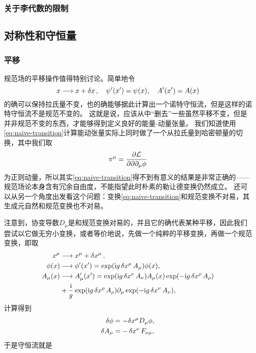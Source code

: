 \documentclass[hyperref, UTF8, a4paper]{ctexart}
\newcommand*{\ii}{\mathrm{i}}
\begin{document}
\subsubsection{关于李代数的限制}


\subsection{对称性和守恒量}

\subsubsection{平移}\label{sec:transition}

规范场的平移操作值得特别讨论。简单地令
\begin{equation}
    x \longrightarrow x + \var{x}, \quad \psi'(x') = \psi(x), \quad A'(x') = A(x)
    \label{eq:naive-transition}
\end{equation}
的确可以保持拉氏量不变，也的确能够据此计算出一个诺特守恒流，但是这样的诺特守恒流不是规范不变的。
这就是说，应该从中“删去”一些虽然平移不变，但是并非规范不变的东西，才能够得到定义良好的能量-动量张量。
我们知道使用\eqref{eq:naive-transition}计算能动张量实际上同时做了一个从拉氏量到哈密顿量的切换，其中我们取
\[
    \pi^\mu = \pdv{\mathcal{L}}{\partial \partial_\mu \phi}
\]
为正则动量，所以其实\eqref{eq:naive-transition}得不到有意义的结果是非常正确的——规范场论本身含有冗余自由度，不能指望此时朴素的勒让德变换仍然成立。
还可以从另一个角度出发看这个问题：变换\eqref{eq:naive-transition}和规范变换不对易，其生成元自然和规范变换也不对易。

注意到，协变导数$D_\mu$是和规范变换对易的，并且它的确代表某种平移，因此我们尝试以它做无穷小变换，或者等价地说，先做一个纯粹的平移变换，再做一个规范变换，即取
\begin{equation}
    \begin{aligned}
        x^\mu &\longrightarrow x^\mu + \var{x^\mu}, \\
        \phi(x) &\longrightarrow \phi'(x') = \exp(\ii g \var{x^\mu} A_\mu) \phi(x), \\
        A_\mu(x) &\longrightarrow A_{\mu}'(x') = \exp(\ii g \var{x^\nu} A_\nu) A_\mu(x) \exp(- \ii g \var{x^\rho} A_\rho) \\
        &+ \frac{\ii}{g} \exp(\ii g \var{x^\rho} A_\rho) \partial_\mu \exp(- \ii g \var{x^\nu} A_\nu),
    \end{aligned}
\end{equation}
计算得到
\begin{equation}
    \begin{aligned}
        \var{\phi} &= - \var x^\mu D_\mu \phi, \\
        \var{A_\mu} &= - \var{x^\nu} F_{\nu \mu},
    \end{aligned} 
\end{equation}
于是守恒流就是
\end{document}
